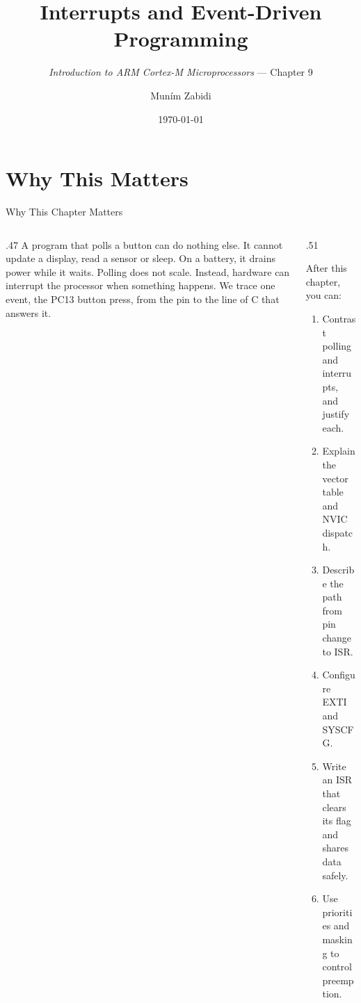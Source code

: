 \documentclass[9pt,aspectratio=169,xcolor=table]{beamer}
\title{Interrupts and Event-Driven Programming}
\subtitle{\emph{Introduction to ARM Cortex-M Microprocessors} --- Chapter 9}
\author{Mun\'{i}m Zabidi}
\institute{\color{primary}Faculty of Electrical Engineering, Universiti Teknologi Malaysia}
\date{\today}
\begin{document}
\titlepage

\section{Why This Matters}

\begin{frame}{Why This Chapter Matters}
    \begin{columns}[T]
    \begin{column}{.47\textwidth}
        {\normalsize A program that polls a button can do nothing else. It cannot update a display, read a sensor or sleep. On a battery, it drains power while it waits. Polling does not scale. Instead, hardware can interrupt the processor when something happens. We trace one event, the PC13 button press, from the pin to the line of C that answers it.}
    \end{column}
    \begin{column}{.51\textwidth}
        \begin{block}{After this chapter, you can:}
        {\small
        \begin{enumerate}\itemsep2pt
            \item Contrast polling and interrupts, and justify each.
            \item Explain the vector table and NVIC dispatch.
            \item Describe the path from pin change to ISR.
            \item Configure EXTI and SYSCFG.
            \item Write an ISR that clears its flag and shares data safely.
            \item Use priorities and masking to control preemption.
        \end{enumerate}}
        \end{block}
    \end{column}
    \end{columns}
\end{frame}


\end{document}
